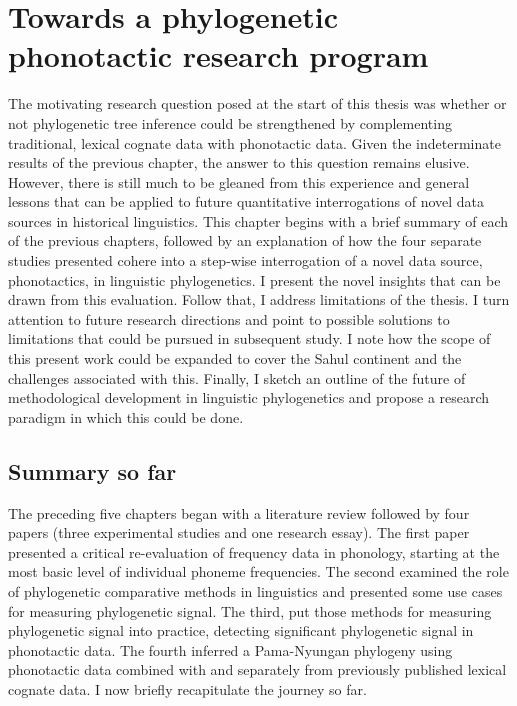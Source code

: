 \chapter[Towards phylogenetic phonotactics]{Towards a phylogenetic phonotactic research program}
\label{ch-discussion}

The motivating research question posed at the start of this thesis was whether or not phylogenetic tree inference could be strengthened by complementing traditional, lexical cognate data with phonotactic data. Given the indeterminate results of the previous chapter, the answer to this question remains elusive. However, there is still much to be gleaned from this experience and general lessons that can be applied to future quantitative interrogations of novel data sources in historical linguistics. This chapter begins with a brief summary of each of the previous chapters, followed by an explanation of how the four separate studies presented cohere into a step-wise interrogation of a novel data source, phonotactics, in linguistic phylogenetics. I present the novel insights that can be drawn from this evaluation. Follow that, I address limitations of the thesis. I turn attention to future research directions and point to possible solutions to limitations that could be pursued in subsequent study. I note how the scope of this present work could be expanded to cover the Sahul continent and the challenges associated with this. Finally, I sketch an outline of the future of methodological development in linguistic phylogenetics and propose a research paradigm in which this could be done.

\hypertarget{discussion-intro}{%
\section{Summary so far}\label{discussion-intro}}

The preceding five chapters began with a literature review followed by four papers (three experimental studies and one research essay). The first paper presented a critical re-evaluation of frequency data in phonology, starting at the most basic level of individual phoneme frequencies. The second examined the role of phylogenetic comparative methods in linguistics and presented some use cases for measuring phylogenetic signal. The third, put those methods for measuring phylogenetic signal into practice, detecting significant phylogenetic signal in phonotactic data. The fourth inferred a Pama-Nyungan phylogeny using phonotactic data combined with and separately from previously published lexical cognate data. I now briefly recapitulate the journey so far.

